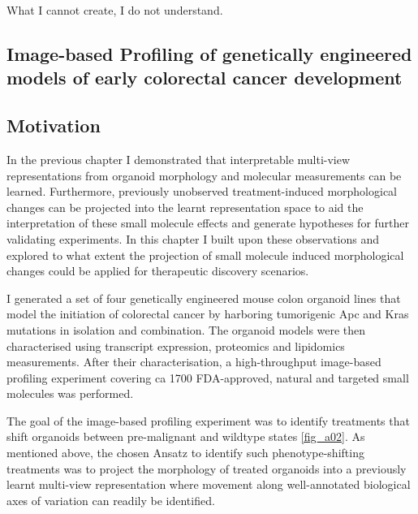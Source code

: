 \begin{savequote}[75mm]
What I cannot create, I do not understand.
\end{savequote}

\begin{flushleft}
\chapter{Image-based Profiling of genetically engineered models of early colorectal cancer development}

\section{Motivation}

In the previous chapter I demonstrated that interpretable multi-view representations from organoid morphology and molecular measurements can be learned. Furthermore, previously unobserved treatment-induced morphological changes can be projected into the learnt representation space to aid the interpretation of these small molecule effects and generate hypotheses for further validating experiments. In this chapter I built upon these observations and explored to what extent the projection of small molecule induced morphological changes could be applied for therapeutic discovery scenarios. 

I generated a set of four genetically engineered mouse colon organoid lines that model the initiation of colorectal cancer by harboring tumorigenic Apc and Kras mutations in isolation and combination. The organoid models were then characterised using transcript expression, proteomics and lipidomics measurements. After their characterisation, a high-throughput image-based profiling experiment covering ca 1700 FDA-approved, natural and targeted small molecules was performed.

The goal of the image-based profiling experiment was to identify treatments that shift organoids between pre-malignant and wildtype states \ref{fig_a02}. As mentioned above, the chosen Ansatz to identify such phenotype-shifting treatments was to project the morphology of treated organoids into a previously learnt multi-view representation where movement along well-annotated biological axes of variation can readily be identified.  


\end{flushleft}
